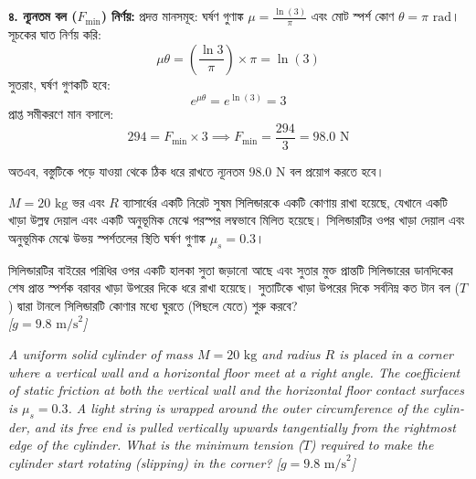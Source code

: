 \documentclass[12pt, a4paper]{article}
\begin{document}
\begin{tcolorbox}[solutionbox={সমাধান (Solution)}]
\vspace{0.5em}
\textbf{৪. ন্যূনতম বল ($F_{\min}$) নির্ণয়:}
প্রদত্ত মানসমূহ: ঘর্ষণ গুণাঙ্ক $\mu = \frac{\ln(3)}{\pi}$ এবং মোট স্পর্শ কোণ $\theta = \pi\text{ rad}$।
সূচকের ঘাত নির্ণয় করি:
$$\mu \theta = \left(\frac{\ln 3}{\pi}\right) \times \pi = \ln(3)$$
সুতরাং, ঘর্ষণ গুণকটি হবে:
$$e^{\mu \theta} = e^{\ln(3)} = 3$$
প্রাপ্ত সমীকরণে মান বসালে:
$$294 = F_{\min} \times 3 \implies F_{\min} = \frac{294}{3} = 98.0\text{ N}$$

অতএব, বস্তুটিকে পড়ে যাওয়া থেকে ঠিক ধরে রাখতে ন্যূনতম $98.0\text{ N}$ বল প্রয়োগ করতে হবে।
\end{tcolorbox}
\vspace{1em}
\begin{tcolorbox}[questionbox={প্রশ্ন (Question) 8}]
\noindent
$M = 20\text{ kg}$ ভর এবং $R$ ব্যাসার্ধের একটি নিরেট সুষম সিলিন্ডারকে একটি কোণায় রাখা হয়েছে, যেখানে একটি খাড়া উল্লম্ব দেয়াল এবং একটি অনুভূমিক মেঝে পরস্পর লম্বভাবে মিলিত হয়েছে। সিলিন্ডারটির ওপর খাড়া দেয়াল এবং অনুভূমিক মেঝে উভয় স্পর্শতলের স্থিতি ঘর্ষণ গুণাঙ্ক $\mu_s = 0.3$। 

\vspace{0.3em}
\noindent
সিলিন্ডারটির বাইরের পরিধির ওপর একটি হালকা সুতা জড়ানো আছে এবং সুতার মুক্ত প্রান্তটি সিলিন্ডারের ডানদিকের শেষ প্রান্ত স্পর্শক বরাবর খাড়া উপরের দিকে ধরে রাখা হয়েছে। সুতাটিকে খাড়া উপরের দিকে সর্বনিম্ন কত টান বল ($T$) দ্বারা টানলে সিলিন্ডারটি কোণার মধ্যে ঘুরতে (পিছলে যেতে) শুরু করবে? \\
\textit{[$g = 9.8\text{ m/s}^2$]}

\vspace{0.8em}
\begin{english}
\noindent\textit{\color{darkgray}
A uniform solid cylinder of mass $M = 20\text{ kg}$ and radius $R$ is placed in a corner where a vertical wall and a horizontal floor meet at a right angle. The coefficient of static friction at both the vertical wall and the horizontal floor contact surfaces is $\mu_s = 0.3$. A light string is wrapped around the outer circumference of the cylinder, and its free end is pulled vertically upwards tangentially from the rightmost edge of the cylinder. What is the minimum tension ($T$) required to make the cylinder start rotating (slipping) in the corner? [$g = 9.8\text{ m/s}^2$]
}
\end{english}
\end{tcolorbox}
\end{document}
